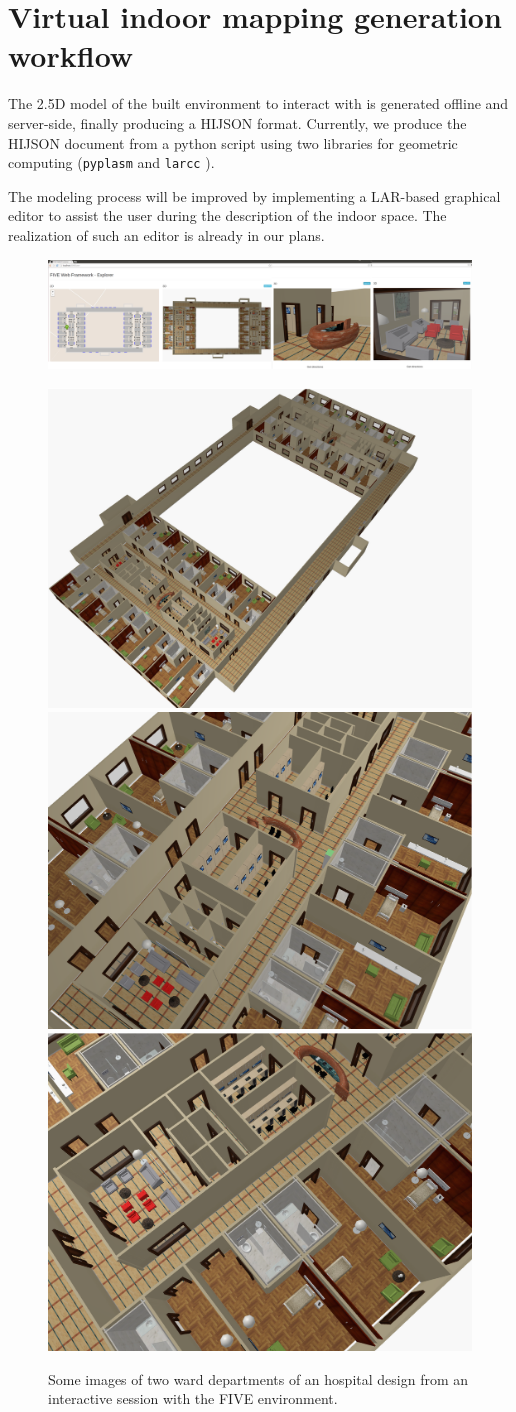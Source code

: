 \section{Virtual indoor mapping generation workflow}\label{workflow}

The 2.5D model of the built environment to interact with is generated offline and server-side, finally producing a HIJSON format.
Currently, we produce the HIJSON document from a python
script using two libraries for geometric computing (\texttt{pyplasm} and \texttt{larcc} \cite{Dicarlo:2014:TNL:2543138.2543294,paoluzziMS:2014,cadanda:2015}).

The modeling process will be improved by implementing a LAR-based 
graphical editor to assist the user during the description of the indoor
space. The realization of such an editor is already in our plans.


\begin{figure}[ptb] %
   \centering
   \includegraphics[width=\linewidth]{images/ward/ward} 
   
   \includegraphics[width=0.327\linewidth]{images/ward/ward1} 
   \includegraphics[width=0.327\linewidth]{images/ward/ward4} 
   \includegraphics[width=0.327\linewidth]{images/ward/ward5} 
   \caption{Some images of two ward departments of an hospital design from an interactive session with the FIVE environment.}
   \label{fig:ward}
\end{figure}



